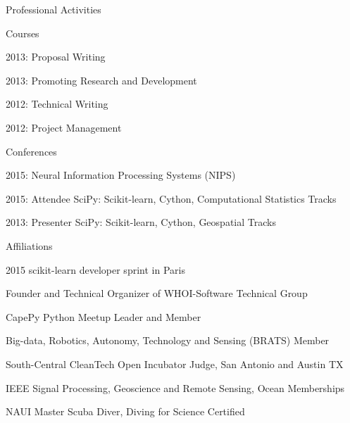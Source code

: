 \documentclass{resume} %
\begin{document}
\begin{rSection}{Professional Activities}
\begin{rSubsection}{Courses}{}{}{}
\item{2013: Proposal Writing}
\item{2013: Promoting Research and Development}
\item{2012: Technical Writing}
\item{2012: Project Management}
\end{rSubsection}

\begin{rSubsection}{Conferences}{}{}{}
\item{2015: Neural Information Processing Systems (NIPS)}
\item{2015: Attendee SciPy: Scikit-learn, Cython, Computational Statistics Tracks}
\item{2013: Presenter SciPy: Scikit-learn, Cython, Geospatial Tracks}
\end{rSubsection}


\begin{rSubsection}{Affiliations}{}{}{}{}
\item{2015 scikit-learn developer sprint in Paris}
\item{Founder and Technical Organizer of WHOI-Software Technical Group}
\item{CapePy Python Meetup Leader and Member}
\item{Big-data, Robotics, Autonomy, Technology and Sensing (BRATS) Member}
\item{South-Central CleanTech Open Incubator Judge, San Antonio and Austin TX}
\item{IEEE Signal Processing, Geoscience and Remote Sensing, Ocean Memberships}
\item{NAUI Master Scuba Diver, Diving for Science Certified}
\end{rSubsection}
\end{rSection}
\end{document}
